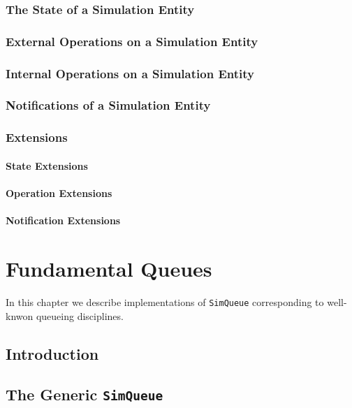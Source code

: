 \documentclass[12pt]{book}
\begin{document}
\subsection{The State of a Simulation Entity}

\subsection{External Operations on a Simulation Entity}

\subsection{Internal Operations on a Simulation Entity}

\subsection{Notifications of a Simulation Entity}

\subsection{Extensions}

\subsubsection{State Extensions}

\subsubsection{Operation Extensions}

\subsubsection{Notification Extensions}

\chapter{Fundamental Queues}

In this chapter we describe implementations of \lstinline|SimQueue| corresponding
  to well-knwon queueing disciplines.

\section{Introduction}

\section{The Generic \lstinline{SimQueue}}
\label{simqueue-generic}
\end{document}
